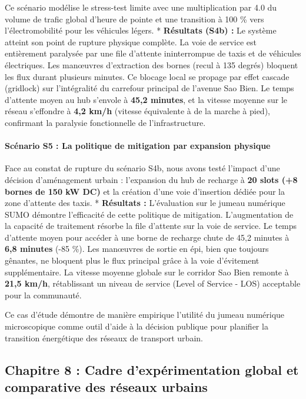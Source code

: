 \documentclass[10pt, a4paper]{article}
\begin{document}
Ce scénario modélise le stress-test limite avec une multiplication par
4.0 du volume de trafic global d'heure de pointe et une transition à 100
\% vers l'électromobilité pour les véhicules légers. * \textbf{Résultats
(S4b) :} Le système atteint son point de rupture physique complète. La
voie de service est entièrement paralysée par une file d'attente
ininterrompue de taxis et de véhicules électriques. Les manœuvres
d'extraction des bornes (recul à 135 degrés) bloquent les flux durant
plusieurs minutes. Ce blocage local se propage par effet cascade
(gridlock) sur l'intégralité du carrefour principal de l'avenue Sao
Bien. Le temps d'attente moyen au hub s'envole à \textbf{45,2 minutes},
et la vitesse moyenne sur le réseau s'effondre à \textbf{4,2 km/h}
(vitesse équivalente à de la marche à pied), confirmant la paralysie
fonctionnelle de l'infrastructure.

\paragraph{Scénario S5 : La politique de mitigation par expansion
physique}\label{scuxe9nario-s5-la-politique-de-mitigation-par-expansion-physique}

Face au constat de rupture du scénario S4b, nous avons testé l'impact
d'une décision d'aménagement urbain : l'expansion du hub de recharge à
\textbf{20 slots (+8 bornes de 150 kW DC)} et la création d'une voie
d'insertion dédiée pour la zone d'attente des taxis. * \textbf{Résultats
:} L'évaluation sur le jumeau numérique SUMO démontre l'efficacité de
cette politique de mitigation. L'augmentation de la capacité de
traitement résorbe la file d'attente sur la voie de service. Le temps
d'attente moyen pour accéder à une borne de recharge chute de 45,2
minutes à \textbf{6,8 minutes} (-85 \%). Les manœuvres de sortie en épi,
bien que toujours gênantes, ne bloquent plus le flux principal grâce à
la voie d'évitement supplémentaire. La vitesse moyenne globale sur le
corridor Sao Bien remonte à \textbf{21,5 km/h}, rétablissant un niveau
de service (Level of Service - LOS) acceptable pour la communauté.

Ce cas d'étude démontre de manière empirique l'utilité du jumeau
numérique microscopique comme outil d'aide à la décision publique pour
planifier la transition énergétique des réseaux de transport urbain.

\newpage

\subsection{Chapitre 8 : Cadre d'expérimentation global et comparative
des réseaux
urbains}\label{chapitre-8-cadre-dexpuxe9rimentation-global-et-comparative-des-ruxe9seaux-urbains}
\end{document}
